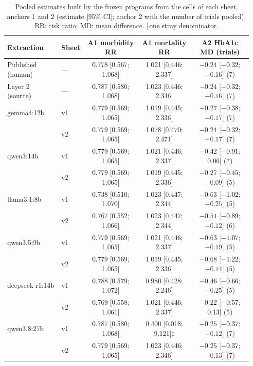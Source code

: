 \documentclass[11pt]{article}
\begin{document}
\begin{table}[!htbp]
\centering\footnotesize
\caption{Pooled estimates built by the frozen programs from the cells of each sheet, anchors 1 and 2 (estimate [95\% CI]; anchor 2 with the number of trials pooled). RR: risk ratio; MD: mean difference. $\ddagger$one stray denominator.}
\label{tab:pools}
\setlength{\tabcolsep}{1.5pt}
\begin{tabular}{llccc}
\toprule
Extraction & Sheet & A1 morbidity RR & A1 mortality RR & A2 HbA1c MD (trials) \\
\midrule
Published (human) & --- & 0.778 [0.567; 1.068] & 1.021 [0.446; 2.337] & $-0.24$ [$-0.32$; $-0.16$] (7) \\
Layer 2 (source) & --- & 0.787 [0.580; 1.068] & 1.023 [0.446; 2.346] & $-0.24$ [$-0.32$; $-0.16$] (7) \\
\midrule
gemma4:12b & v1 & 0.779 [0.569; 1.065] & 1.019 [0.445; 2.336] & $-0.27$ [$-0.38$; $-0.17$] (7) \\
 & v2 & 0.779 [0.569; 1.065] & 1.078 [0.470; 2.471] & $-0.24$ [$-0.32$; $-0.17$] (7) \\
qwen3:14b & v1 & 0.779 [0.569; 1.065] & 1.021 [0.446; 2.337] & $-0.42$ [$-0.91$; 0.06] (7) \\
 & v2 & 0.779 [0.569; 1.065] & 1.019 [0.445; 2.336] & $-0.27$ [$-0.45$; $-0.09$] (5) \\
llama3.1:8b & v1 & 0.738 [0.510; 1.070] & 1.023 [0.447; 2.344] & $-0.63$ [$-1.02$; $-0.25$] (5) \\
 & v2 & 0.767 [0.552; 1.066] & 1.023 [0.447; 2.344] & $-0.51$ [$-0.89$; $-0.12$] (6) \\
qwen3.5:9b & v1 & 0.779 [0.569; 1.065] & 1.021 [0.446; 2.337] & $-0.63$ [$-1.07$; $-0.19$] (5) \\
 & v2 & 0.779 [0.569; 1.065] & 1.019 [0.445; 2.336] & $-0.68$ [$-1.22$; $-0.14$] (5) \\
deepseek-r1:14b & v1 & 0.788 [0.579; 1.072] & 0.980 [0.428; 2.246] & $-0.46$ [$-0.66$; $-0.25$] (5) \\
 & v2 & 0.769 [0.558; 1.061] & 1.021 [0.446; 2.337] & $-0.22$ [$-0.57$; 0.13] (5) \\
qwen3.8:27b & v1 & 0.787 [0.580; 1.068] & 0.400 [0.018; 9.121]$\ddagger$ & $-0.25$ [$-0.37$; $-0.12$] (7) \\
 & v2 & 0.779 [0.569; 1.065] & 1.023 [0.446; 2.346] & $-0.25$ [$-0.37$; $-0.13$] (7) \\
\bottomrule
\end{tabular}
\end{table}
\end{document}
